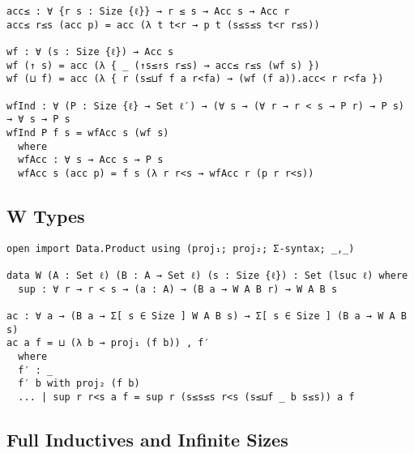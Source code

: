 \begin{singlespace}
\begin{verbatim}
acc≤ : ∀ {r s : Size {ℓ}} → r ≤ s → Acc s → Acc r
acc≤ r≤s (acc p) = acc (λ t t<r → p t (s≤s≤s t<r r≤s))

wf : ∀ (s : Size {ℓ}) → Acc s
wf (↑ s) = acc (λ { _ (↑s≤↑s r≤s) → acc≤ r≤s (wf s) })
wf (⊔ f) = acc (λ { r (s≤⊔f f a r<fa) → (wf (f a)).acc< r r<fa })

wfInd : ∀ (P : Size {ℓ} → Set ℓ′) → (∀ s → (∀ r → r < s → P r) → P s) → ∀ s → P s
wfInd P f s = wfAcc s (wf s)
  where
  wfAcc : ∀ s → Acc s → P s
  wfAcc s (acc p) = f s (λ r r<s → wfAcc r (p r r<s))
\end{verbatim}
\end{singlespace}

\subsection{W Types} \label{app:mechanization:agda:W}

\begin{singlespace}
\begin{verbatim}
open import Data.Product using (proj₁; proj₂; Σ-syntax; _,_)

data W (A : Set ℓ) (B : A → Set ℓ) (s : Size {ℓ}) : Set (lsuc ℓ) where
  sup : ∀ r → r < s → (a : A) → (B a → W A B r) → W A B s

ac : ∀ a → (B a → Σ[ s ∈ Size ] W A B s) → Σ[ s ∈ Size ] (B a → W A B s)
ac a f = ⊔ (λ b → proj₁ (f b)) , f′
  where
  f′ : _
  f′ b with proj₂ (f b)
  ... | sup r r<s a f = sup r (s≤s≤s r<s (s≤⊔f _ b s≤s)) a f
\end{verbatim}
\end{singlespace}

\subsection{Full Inductives and Infinite Sizes}

